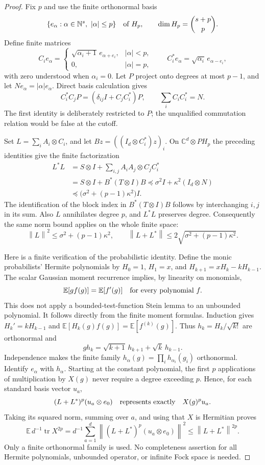 \documentclass[11pt,a4paper]{article}
\newcommand{\C}{\mathbb C}
\newcommand{\N}{\mathbb N}
\newcommand{\norm}[1]{\left\lVert#1\right\rVert}
\DeclareMathOperator{\tr}{tr}
\begin{document}
\begin{proof}
Fix $p$ and use the finite orthonormal basis
\[
 \{e_\alpha:\alpha\in\N^s,\ |\alpha|\leq p\}
 \quad\hbox{of }H_p,
 \qquad \dim H_p=\binom{s+p}{p}.
\]
Define finite matrices
\[
 C_i e_\alpha=
 \begin{cases}
 \sqrt{\alpha_i+1}\,e_{\alpha+e_i},&|\alpha|<p,\\
 0,&|\alpha|=p,
 \end{cases}
 \qquad
 C_i^*e_\alpha=\sqrt{\alpha_i}\,e_{\alpha-e_i},
\]
with zero understood when $\alpha_i=0$.  Let $P$ project onto degrees
at most $p-1$, and let $N e_\alpha=|\alpha|e_\alpha$.  Direct basis
calculation gives
\[
 C_i^*C_jP=(\delta_{ij}I+C_jC_i^*)P,
 \qquad \sum_iC_iC_i^*=N.
\]
The first identity is deliberately restricted to $P$; the unqualified
commutation relation would be false at the cutoff.

Set $L=\sum_iA_i\otimes C_i$, and let
$Bz=((I_d\otimes C_i^*)z)_i$.  On $\C^d\otimes PH_p$ the preceding
identities give the finite factorization
\begin{align*}
 L^*L
 &=S\otimes I+\sum_{i,j}A_iA_j\otimes C_jC_i^*\\
 &=S\otimes I+B^*(T\otimes I)B
 \preceq\sigma^2I+\kappa^2(I_d\otimes N)\\
 &\preceq\bigl(\sigma^2+(p-1)\kappa^2\bigr)I.
\end{align*}
The identification of the block index in $B^*(T\otimes I)B$ follows by
interchanging $i,j$ in its sum.  Also $L$ annihilates degree $p$, and
$L^*L$ preserves degree.  Consequently the same norm bound applies on
the whole finite space:
\[
 \norm L^2\leq\sigma^2+(p-1)\kappa^2,
 \qquad
 \norm{L+L^*}\leq2\sqrt{\sigma^2+(p-1)\kappa^2}.
\]

Here is a finite verification of the probabilistic identity.  Define
the monic probabilists' Hermite polynomials by
$H_0=1$, $H_1=x$, and
$H_{k+1}=xH_k-kH_{k-1}$.  The scalar Gaussian moment recurrence implies,
by linearity on monomials,
\[
             \mathbb E[g f(g)]=\mathbb E[f'(g)]
             \quad\hbox{for every polynomial }f.
\]
This does not apply a bounded-test-function Stein lemma to an unbounded
polynomial.  It follows directly from the finite moment formulas.
Induction gives $H_k'=kH_{k-1}$ and
$\mathbb E[H_k(g)f(g)]=\mathbb E[f^{(k)}(g)]$.
Thus $h_k=H_k/\sqrt{k!}$ are orthonormal and
\[
 gh_k=\sqrt{k+1}\,h_{k+1}+\sqrt{k}\,h_{k-1}.
\]
Independence makes the finite family
$h_\alpha(g)=\prod_i h_{\alpha_i}(g_i)$ orthonormal.  Identify
$e_\alpha$ with $h_\alpha$.  Starting at the constant polynomial, the
first $p$ applications of multiplication by $X(g)$ never require a
degree exceeding $p$.  Hence, for each standard basis vector $u_a$,
\[
 (L+L^*)^p(u_a\otimes e_0)
       \quad\hbox{represents exactly}\quad X(g)^p u_a.
\]
Taking its squared norm, summing over $a$, and using that $X$ is
Hermitian proves
\[
 \mathbb E\,d^{-1}\tr X^{2p}
   =d^{-1}\sum_{a=1}^d\norm{(L+L^*)^p(u_a\otimes e_0)}^2
   \leq\norm{L+L^*}^{2p}.
\]
Only a finite orthonormal family is used.  No completeness assertion for
all Hermite polynomials, unbounded operator, or infinite Fock space is
needed.


\end{proof}
\end{document}
